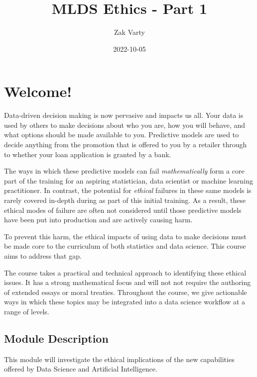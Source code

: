 \documentclass[
]{book}
\title{MLDS Ethics - Part 1}
\author{Zak Varty}
\date{2022-10-05}
\theoremstyle{definition}
\theoremstyle{definition}
\theoremstyle{definition}
\theoremstyle{definition}
\theoremstyle{remark}
\begin{document}
\maketitle

{
\setcounter{tocdepth}{1}
\tableofcontents
}
\hypertarget{welcome}{%
\chapter*{Welcome!}\label{welcome}}

Data-driven decision making is now pervasive and impacts us all. Your data is used by others to make decisions about who you are, how you will behave, and what options should be made available to you. Predictive models are used to decide anything from the promotion that is offered to you by a retailer through to whether your loan application is granted by a bank.

The ways in which these predictive models can fail \emph{mathematically} form a core part of the training for an aspiring statistician, data scientist or machine learning practitioner. In contrast, the potential for \emph{ethical} failures in these same models is rarely covered in-depth during as part of this initial training. As a result, these ethical modes of failure are often not considered until those predictive models have been put into production and are actively causing harm.

To prevent this harm, the ethical impacts of using data to make decisions must be made core to the curriculum of both statistics and data science. This course aims to address that gap.

The course takes a practical and technical approach to identifying these ethical issues. It has a strong mathematical focus and will not not require the authoring of extended essays or moral treaties. Throughout the course, we give actionable ways in which these topics may be integrated into a data science workflow at a range of levels.

\hypertarget{module-description}{%
\section*{Module Description}\label{module-description}}

This module will investigate the ethical implications of the new capabilities offered by Data Science and Artificial Intelligence.
\end{document}
